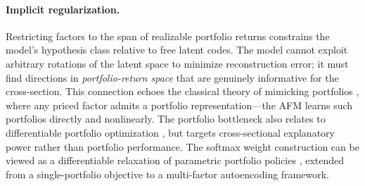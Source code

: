 \paragraph{Implicit regularization.} Restricting factors to the span of realizable portfolio returns constrains the model's hypothesis class relative to free latent codes. The model cannot exploit arbitrary rotations of the latent space to minimize reconstruction error; it must find directions in \emph{portfolio-return space} that are genuinely informative for the cross-section. This connection echoes the classical theory of mimicking portfolios \citep{Huberman1987mimicking}, where any priced factor admits a portfolio representation---the AFM learns such portfolios directly and nonlinearly. The portfolio bottleneck also relates to differentiable portfolio optimization \citep{Donti2017taskbased, Agrawal2019differentiable}, but targets cross-sectional explanatory power rather than portfolio performance. The softmax weight construction can be viewed as a differentiable relaxation of parametric portfolio policies \citep{Brandt2009parametric}, extended from a single-portfolio objective to a multi-factor autoencoding framework.
